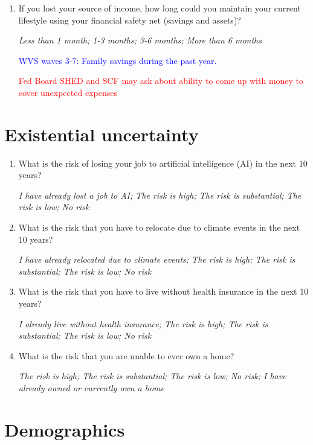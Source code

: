 \documentclass[11pt, headsepline]{article}
\newcommand{\blue}[1]{\textcolor{blue}{#1}}
\newcommand{\red}[1]{\textcolor{red}{#1}}
\begin{document}
\begin{enumerate}[resume]
    \item If you lost your source of income, how long could you maintain your current lifestyle using your financial safety net (savings and assets)?

    \textit{Less than 1 month; 1-3 months; 3-6 months; More than 6 months}

    \blue{WVS waves 3-7: Family savings during the past year.}

    \red{Fed Board SHED and SCF may ask about ability to come up with money to cover unexpected expenses}

\end{enumerate}

\section*{Existential uncertainty}

\begin{enumerate}[resume]

    \item What is the risk of losing your job to artificial intelligence (AI) in the next 10 years?

    \textit{I have already lost a job to AI; The risk is high; The risk is substantial; The risk is low; No risk}

    \item What is the risk that you have to relocate due to climate events in the next 10 years?

    \textit{I have already relocated due to climate events; The risk is high; The risk is substantial; The risk is low; No risk}

    \item What is the risk that you have to live without health insurance in the next 10 years?

    \textit{I already live without health insurance; The risk is high; The risk is substantial; The risk is low; No risk}

    \item What is the risk that you are unable to ever own a home?

    \textit{The risk is high; The risk is substantial; The risk is low; No risk; I have already owned or currently own a home}

\end{enumerate}

\section*{Demographics}
\end{document}
